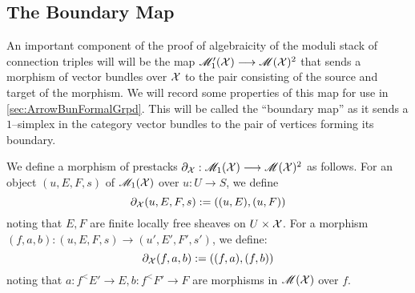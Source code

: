 \documentclass[11pt]{amsart}
\begin{document}
\subsection{The Boundary Map}

An important component of the proof of algebraicity of the moduli stack
of connection triples will will be the map $\sM'_1(\mcX) \to \sM(\mcX)^2$
that sends a morphism of vector bundles over $\mathcal{X}$ to the pair consisting
of the source and target of the morphism. We will record some properties
of this map for use in \cref{sec:ArrowBunFormalGrpd}. This will be called the
``boundary map'' as it sends a $1$--simplex in the category vector bundles
to the pair of vertices forming its boundary.

\begin{cns}\label{defn:bndry-map}
We define a morphism of prestacks $\partial_\mcX : \sM_1(\mcX) \to \sM(\mcX)^2$
as follows.
For an object $(u, E, F, s)$ of $\mathscr{M}_1(\mathcal{X})$ over $u : U \to S$, we define
\[
\partial_\mathcal{X}(u, E, F, s) := ((u, E), (u, F))
\]
noting that $E, F$ are finite locally free sheaves on $U \times \mathcal{X}$.
For a morphism $(f, a, b) : (u, E, F, s) \to (u', E', F', s')$, we define:
\[
\partial_\mathcal{X}(f, a, b) := ((f, a), (f, b))
\]
noting that $a : f^<E' \to E, b : f^<F' \to F$ are morphisms
in $\mathscr{M}(\mathcal{X})$ over $f$.
\end{cns}
\end{document}
